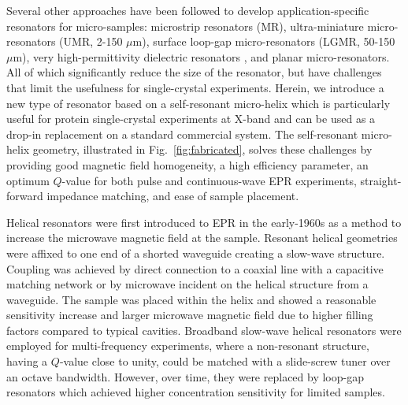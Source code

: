 Several other approaches have been followed to develop application-specific resonators for micro-samples: microstrip resonators (MR)\cite{Microstrip2009, GhirriMicroStrip}, ultra-miniature micro-resonators (UMR, 2-150 $\mu$m)\cite{AharonBlankUltra2013}, surface loop-gap micro-resonators (LGMR, 50-150 $\mu$m)\cite{AharonSurface2010}, very high-permittivity dielectric resonators \cite{walsh86, GOLOVINA200852}, and planar micro-resonators. \cite{Suter2005, Suter2008, suter2015} All of which significantly reduce the size of the resonator, but have challenges that limit the usefulness for single-crystal experiments. Herein, we introduce a new type of resonator based on a self-resonant micro-helix which is particularly useful for protein single-crystal experiments at X-band and can be used as a drop-in replacement on a standard commercial system. The self-resonant micro-helix geometry, illustrated in Fig.~\ref{fig:fabricated}, solves these challenges by providing good magnetic field homogeneity, a high efficiency parameter, an optimum $Q$-value for both pulse and continuous-wave EPR experiments, straight-forward impedance matching, and ease of sample placement. 

Helical resonators were first introduced to EPR in the early-1960s as a method to increase the microwave magnetic field at the sample. Resonant helical geometries were affixed to one end of a shorted waveguide creating a slow-wave structure. \cite{Webb1962, Helix1967} Coupling was achieved by direct connection to a coaxial line with a capacitive matching network or by microwave incident on the helical structure from a waveguide. The sample was placed within the helix and showed a reasonable sensitivity increase and larger microwave magnetic field due to higher filling factors compared to typical cavities. \cite{Nolle1966} Broadband slow-wave helical resonators were employed for multi-frequency experiments, where a non-resonant structure, having a $Q$-value close to unity, could be matched with a slide-screw tuner over an octave bandwidth. \cite{nonresonant1986} However, over time, they were replaced by loop-gap resonators which achieved higher concentration sensitivity for limited samples. \cite{froncisz1982loop}

